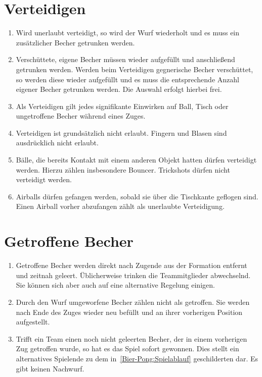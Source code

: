 \section{Verteidigen}\label{Bier-Pong:Verteidigen}
\begin{enumerate}[label={(\arabic*)}]
    \item
    Wird unerlaubt verteidigt, so wird der Wurf wiederholt und es muss ein zusätzlicher Becher getrunken werden.

    \item
    Verschüttete, eigene Becher müssen wieder aufgefüllt und anschließend getrunken werden.
    Werden beim Verteidigen gegnerische Becher verschüttet, so werden diese wieder aufgefüllt und es muss die entsprechende Anzahl eigener Becher getrunken werden.
    Die Auswahl erfolgt hierbei frei.

    \item
    Als Verteidigen gilt jedes signifikante Einwirken auf Ball, Tisch oder ungetroffene Becher während eines Zuges.

    \item
    Verteidigen ist grundsätzlich nicht erlaubt.
    Fingern und Blasen sind ausdrücklich nicht erlaubt.

    \item
    Bälle, die bereits Kontakt mit einem anderen Objekt hatten dürfen verteidigt werden.
    Hierzu zählen insbesondere Bouncer.
    Trickshots dürfen nicht verteidigt werden.

    \item
    Airballs dürfen gefangen werden, sobald sie über die Tischkante geflogen sind.
    Einen Airball vorher abzufangen zählt als unerlaubte Verteidigung.
\end{enumerate}

\section{Getroffene Becher}
\begin{enumerate}[label={(\arabic*)}]
    \item
    Getroffene Becher werden direkt nach Zugende aus der Formation entfernt und zeitnah geleert.
    Üblicherweise trinken die Teammitglieder abwechselnd.
    Sie können sich aber auch auf eine alternative Regelung einigen.

    \item
    Durch den Wurf umgeworfene Becher zählen nicht als getroffen.
    Sie werden nach Ende des Zuges wieder neu befüllt und an ihrer vorherigen Position aufgestellt.

    \item
    Trifft ein Team einen noch nicht geleerten Becher, der in einem vorherigen Zug getroffen wurde, so hat es das Spiel sofort gewonnen.
    Dies stellt ein alternatives Spielende zu dem in~\ref{Bier-Pong:Spielablauf} geschilderten dar.
    Es gibt keinen Nachwurf.
\end{enumerate}

